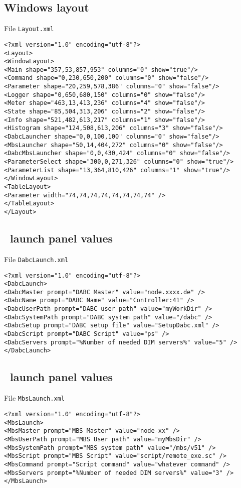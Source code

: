 \subsection{Windows layout}
File {\tt Layout.xml}
{\small \begin{verbatim}
<?xml version="1.0" encoding="utf-8"?>
<Layout>
<WindowLayout>
<Main shape="357,53,857,953" columns="0" show="true"/>
<Command shape="0,230,650,200" columns="0" show="false"/>
<Parameter shape="20,259,578,386" columns="0" show="false"/>
<Logger shape="0,650,680,150" columns="0" show="false"/>
<Meter shape="463,13,413,236" columns="4" show="false"/>
<State shape="85,504,313,206" columns="2" show="false"/>
<Info shape="521,482,613,217" columns="1" show="false"/>
<Histogram shape="124,508,613,206" columns="3" show="false"/>
<DabcLauncher shape="0,0,100,100" columns="0" show="false"/>
<MbsLauncher shape="50,14,404,272" columns="0" show="false"/>
<DabcMbsLauncher shape="0,0,430,424" columns="0" show="false"/>
<ParameterSelect shape="300,0,271,326" columns="0" show="true"/>
<ParameterList shape="13,364,810,426" columns="1" show="true"/>
</WindowLayout>
<TableLayout>
<Parameter width="74,74,74,74,74,74,74,74" />
</TableLayout>
</Layout>
\end{verbatim}
}
\subsection{\dabc\ launch panel values}
File {\tt DabcLaunch.xml}
{\small \begin{verbatim}
<?xml version="1.0" encoding="utf-8"?>
<DabcLaunch>
<DabcMaster prompt="DABC Master" value="node.xxxx.de" />
<DabcName prompt="DABC Name" value="Controller:41" />
<DabcUserPath prompt="DABC user path" value="myWorkDir" />
<DabcSystemPath prompt="DABC system path" value="/dabc" />
<DabcSetup prompt="DABC setup file" value="SetupDabc.xml" />
<DabcScript prompt="DABC Script" value="ps" />
<DabcServers prompt="%Number of needed DIM servers%" value="5" />
</DabcLaunch>
\end{verbatim}
}
\subsection{\mbs\ launch panel values}
File {\tt MbsLaunch.xml}
{\small \begin{verbatim}
<?xml version="1.0" encoding="utf-8"?>
<MbsLaunch>
<MbsMaster prompt="MBS Master" value="node-xx" />
<MbsUserPath prompt="MBS User path" value="myMbsDir" />
<MbsSystemPath prompt="MBS system path" value="/mbs/v51" />
<MbsScript prompt="MBS Script" value="script/remote_exe.sc" />
<MbsCommand prompt="Script command" value="whatever command" />
<MbsServers prompt="%Number of needed DIM servers%" value="3" />
</MbsLaunch>
\end{verbatim}
}
